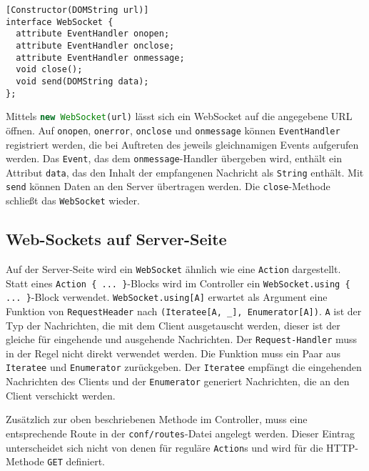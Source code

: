 \begin{lstlisting}[language=idl, caption=Das WebSocket-Interface in JavaScript, label=lst:das_websocket_interface_in_javascript]
[Constructor(DOMString url)]
interface WebSocket {
  attribute EventHandler onopen;
  attribute EventHandler onclose;
  attribute EventHandler onmessage;
  void close();
  void send(DOMString data);
};
\end{lstlisting}

Mittels \lstinline[language=javascript]|new WebSocket(url)| lässt sich ein WebSocket auf die angegebene URL öffnen.
Auf \lstinline|onopen|, \lstinline|onerror|, \lstinline|onclose| und \lstinline|onmessage| können \lstinline|EventHandler| registriert werden, die bei Auftreten des jeweils gleichnamigen Events aufgerufen werden.
Das \lstinline|Event|, das dem \lstinline|onmessage|-Handler übergeben wird, enthält ein Attribut \lstinline|data|, das den Inhalt der empfangenen Nachricht als \lstinline|String| enthält.
Mit \lstinline|send| können Daten an den Server übertragen werden.
Die \lstinline|close|-Methode schließt das \lstinline|WebSocket| wieder.


\subsection{Web-Sockets auf Server-Seite} %
\label{sub:web_sockets_auf_server_seite}

Auf der Server-Seite wird ein \lstinline|WebSocket| ähnlich wie eine \lstinline|Action| dargestellt.
Statt eines \lstinline|Action { ... }|-Blocks wird im Controller ein \lstinline|WebSocket.using { ... }|-Block verwendet.
\lstinline|WebSocket.using[A]| erwartet als Argument eine Funktion von \lstinline|RequestHeader| nach \lstinline|(Iteratee[A, _], Enumerator[A])|.
\lstinline|A| ist der Typ der Nachrichten, die mit dem Client ausgetauscht werden, dieser ist der gleiche für eingehende und ausgehende Nachrichten.
Der \lstinline|Request-Handler| muss in der Regel nicht direkt verwendet werden.
Die Funktion muss ein Paar aus \lstinline|Iteratee| und \lstinline|Enumerator| zurückgeben.
Der \lstinline|Iteratee| empfängt die eingehenden Nachrichten des Clients und der \lstinline|Enumerator| generiert Nachrichten, die an den Client verschickt werden.

Zusätzlich zur oben beschriebenen Methode im Controller, muss eine entsprechende Route in der \lstinline|conf/routes|-Datei angelegt werden.
Dieser Eintrag unterscheidet sich nicht von denen für reguläre \lstinline|Action|s und wird für die HTTP-Methode \lstinline|GET| definiert.

